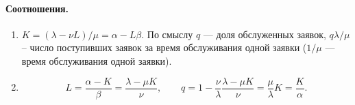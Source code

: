 \paragraph{Соотношения.}
\begin{enumerate}
  \item $K = (\lambda-\nu L)/\mu = \alpha - L\beta$.
    По смыслу $q$ --- доля обслуженных заявок,
    $q\lambda/\mu$ -- число поступивших заявок за время обслуживания одной заявки
    ($1/\mu$ --- время обслуживания одной заявки).

  \item 
    \[
    L = \dfrac{\alpha - K}{\beta} = \dfrac{\lambda - \mu K}{\nu},\qquad
    q = 1 - \dfrac{\nu}{\lambda} \dfrac{\lambda - \mu K}{\nu} = \dfrac{\mu}{\lambda} K
    = \dfrac{K}{\alpha}.
  \]
\end{enumerate}

